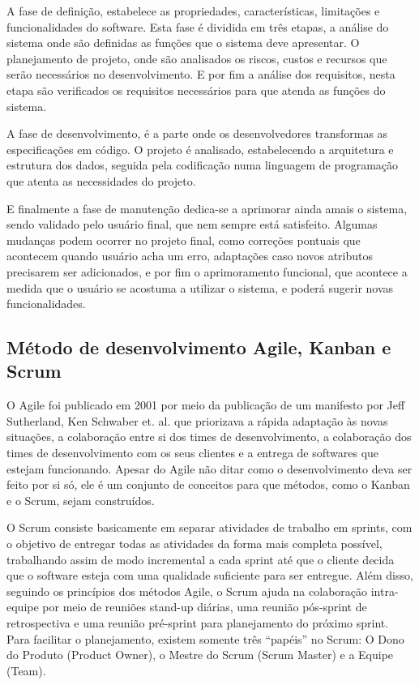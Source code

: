 \documentclass[
	article,			%
	11pt,				%
	oneside,			%
	a4paper,			%
	english,			%
	brazil,				%
	sumario=tradicional
	]{abntex2}
\begin{document}
A fase de definição, estabelece as propriedades, características, limitações e funcionalidades do software.
Esta fase é dividida em três etapas, a análise do sistema onde são definidas as funções que o sistema deve apresentar.
O planejamento de projeto, onde  são analisados os riscos, custos e recursos que serão necessários no desenvolvimento.
E por fim a análise dos requisitos, nesta etapa são verificados os requisitos necessários para que atenda as funções do sistema.

A fase de desenvolvimento, é a parte onde os desenvolvedores transformas as especificações em código.
O projeto é analisado, estabelecendo a arquitetura e estrutura dos dados, seguida pela codificação numa linguagem de programação que atenta as necessidades do projeto.

E finalmente a fase de manutenção dedica-se a aprimorar ainda amais o sistema, sendo validado pelo usuário final, que nem sempre está satisfeito.
Algumas mudanças podem ocorrer no projeto final, como correções pontuais que acontecem quando usuário acha um erro, adaptações caso novos atributos precisarem ser adicionados, e por fim o aprimoramento funcional, que acontece a medida que o usuário se acostuma a utilizar o sistema, e poderá sugerir novas funcionalidades.

\subsection{Método de desenvolvimento Agile, Kanban e Scrum}

O Agile foi publicado em 2001 por meio da publicação de um manifesto por Jeff Sutherland, Ken Schwaber et. al. que priorizava a rápida adaptação às novas situações, a colaboração entre si dos times de desenvolvimento, a colaboração dos times de desenvolvimento com os seus clientes e a entrega de softwares que estejam funcionando. \cite{agilemanifesto}
Apesar do Agile não ditar como o desenvolvimento deva ser feito por si só, ele é um conjunto de conceitos para que métodos, como o Kanban e o Scrum, sejam construídos.

O Scrum consiste basicamente em separar atividades de trabalho em sprints, com o objetivo de entregar todas as atividades da forma mais completa possível, trabalhando assim de modo incremental a cada sprint até que o cliente decida que o software esteja com uma qualidade suficiente para ser entregue.
Além disso, seguindo os princípios dos métodos Agile, o Scrum ajuda na colaboração intra-equipe por meio de reuniões stand-up diárias, uma reunião pós-sprint de retrospectiva e uma reunião pré-sprint para planejamento do próximo sprint.
Para facilitar o planejamento, existem somente três “papéis” no Scrum: O Dono do Produto (Product Owner), o Mestre do Scrum (Scrum Master) e a Equipe (Team).
\end{document}
